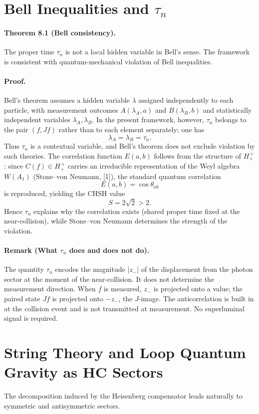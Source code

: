 \section{Bell Inequalities and \texorpdfstring{$\tau_n$}{tau_n}}
\paragraph*{Theorem 8.1 (Bell consistency).}
The proper time $\tau_n$ is not a local hidden variable in Bell's sense. The framework is consistent with quantum-mechanical violation of Bell inequalities.

\paragraph*{Proof.}
Bell's theorem assumes a hidden variable $\lambda$ assigned independently to each particle, with measurement outcomes $A(\lambda_A,a)$ and $B(\lambda_B,b)$ and statistically independent variables $\lambda_A,\lambda_B$. In the present framework, however, $\tau_n$ belongs to the pair $(f,Jf)$ rather than to each element separately; one has
\[
\lambda_A = \lambda_B = \tau_n.
\]
Thus $\tau_n$ is a contextual variable, and Bell's theorem does not exclude violation by such theories. The correlation function $E(a,b)$ follows from the structure of $H_+^{\,+}$: since $C(f) \in H_+^{\,+}$ carries an irreducible representation of the Weyl algebra $W(A_1)$ (Stone--von Neumann, [1]), the standard quantum correlation
\[
E(a,b)=\cos \theta_{ab}
\]
is reproduced, yielding the CHSH value
\[
S = 2\sqrt{2} > 2.
\]
Hence $\tau_n$ explains why the correlation exists (shared proper time fixed at the near-collision), while Stone--von Neumann determines the strength of the violation.

\paragraph*{Remark (What $\tau_n$ does and does not do).}
The quantity $\tau_n$ encodes the magnitude $|z_-|$ of the displacement from the photon sector at the moment of the near-collision. It does not determine the measurement direction. When $f$ is measured, $z_-$ is projected onto a value; the paired state $Jf$ is projected onto $-z_-$, the $J$-image. The anticorrelation is built in at the collision event and is not transmitted at measurement. No superluminal signal is required.

\section{String Theory and Loop Quantum Gravity as HC Sectors}
The decomposition induced by the Heisenberg compensator leads naturally to symmetric and antisymmetric sectors.

